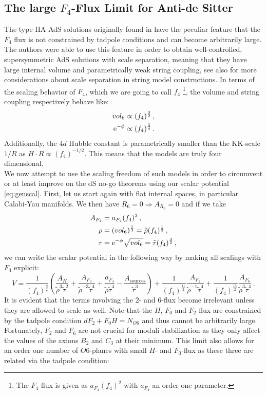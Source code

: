 \documentclass[a4paper,12pt,twoside,openright]{report}
\newcommand{\be}{\begin{equation}}
\newcommand{\ee}{\end{equation}}
\newcommand{\bea}{\begin{equation}\begin{aligned}}
\newcommand{\eea}{\end{aligned}\end{equation}}
\def\rme{{\rm e}}
\begin{document}
\subsection{The large $F_4$-Flux Limit for Anti-de Sitter}
The type IIA AdS solutions originally found in \cite{DeWolfe:2005uu} have the peculiar feature that the $F_4$ flux is not constrained by tadpole conditions and can become arbitrarily large. The authors were able to use this feature in order to obtain well-controlled, supersymmetric AdS solutions with scale separation, meaning that they have large internal volume and parametrically weak string coupling, see also \cite{Dasgupta:1999ss,Giddings:2001yu,Balasubramanian:2005zx,Gautason:2015tig,Westphal:2006tn,Farakos:2020phe} for more considerations about scale separation in string model constructions. In terms of the scaling behavior of $F_4$, which we are going to call $f_4$ \footnote{The $F_4$ flux is given as $a_{F_4} (f_4)^ 2$ with $a_{F_4}$ an order one parameter.}, the volume and string coupling respectively behave like:
\bea 
vol_6 &\propto (f_4)^ {\frac{3}{2}}\,,\\
\rme^ {-\phi} &\propto (f_4)^ {\frac{3}{4}}\,.
\eea
Additionally, the $4d$ Hubble constant is parametrically smaller than the KK-scale $1/R$ as $H\cdot R \propto (f_4)^ {-1/2}$. This means that the models are truly four dimensional.\\
We now attempt to use the scaling freedom of such models in order to circumvent or at least improve on the dS no-go theorems using our scalar  potential \eqref{eq:genscal}. First, let us start again with flat internal spaces, in particular Calabi-Yau manifolds. We then have $R_6=0 \Rightarrow A_{R_6} =0$ and if we take 
\bea 
A_{F_4} &= a_{F_4} (f_4)^ 2\,,\\
\rho &= (vol_6)^ {\frac{1}{3}} = \tilde{\rho} (f_4)^ {\frac{1}{2}}\,,\\
\tau &= \rme^ {-\phi} \sqrt{vol_6} = \tilde{\tau} (f_4)^ {\frac{3}{2}}\,,
\eea
we can write the scalar potential in the following way by making all scalings with $F_4$ explicit:
\be 
V = \frac{1}{(f_4)^ {\frac{9}{2}}} \left( \frac{A_H}{\tilde{\rho}^3 \tilde{\tau}^ 2} + \frac{A_{F_0}}{\tilde{\rho}^ {-3}\tilde{\tau}^ 4} + \frac{a_{F_4}}{\tilde{\rho}\tilde{\tau}^ 4} - \frac{A_{\text{sources}}}{\tilde{\tau}^ 3} \right) + \frac{1}{(f_4)^ {\frac{11}{2}}} \frac{A_{F_2}}{\tilde{\rho}^ {-1}\tilde{\tau}^ 4} + \frac{1}{(f_4)^ {\frac{15}{2}}} \frac{A_{F_6}}{\tilde{\rho}^3\tilde{\tau}^ 4}\,.
\ee
It is evident that the terms involving the $2$- and $6$-flux become irrelevant unless they are allowed to scale as well. Note that the $H$, $F_0$ and $F_2$ flux are constrained by the tadpole condition $dF_2 + F_0H = N_{O6}$ and thus cannot be arbitrarily large. Fortunately, $F_2$ and $F_6$ are not crucial for moduli stabilization \cite{DeWolfe:2005uu} as they only affect the values of the axions $B_2$ and $C_3$ at their minimum. This limit also allows for an order one number of $O6$-planes with small $H$- and $F_0$-flux as these three are related via the tadpole condition:
\end{document}
